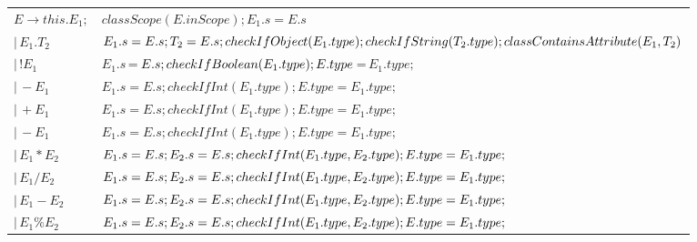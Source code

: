 \documentclass[11pt, oneside]{article}
\begin{document}
\begin{tabularx}{\textwidth}{ |X|X| }
\hline $E \rightarrow this.E_1; $ & $ classScope(E.inScope); E_1.s = E.s $ \\

	   $| \, E_1.T_2 $ & $ E_1.s = E.s; T_2 = E.s; checkIfObject(E_1.type); \newline checkIfString(T_2.type); \newline classContainsAttribute(E_1, T_2) $ \\
	   
	   $| \, !E_1 $ & $ E_1.s\,$=$\,E.s; checkIfBoolean(E_1.type); \newline E.type\,$=$\,E_1.type; $ \\
	   
	   $| \, -E_1 $ & $ E_1.s = E.s; checkIfInt(E_1.type); E.type = E_1.type; $ \\
	   $| \, +E_1 $ & $ E_1.s = E.s; checkIfInt(E_1.type); E.type = E_1.type; $ \\
	   $| \, -E_1 $ & $ E_1.s = E.s; checkIfInt(E_1.type); E.type = E_1.type; $ \\
	   
	   $| \, E_1*E_2 $ & $ E_1.s = E.s; E_2.s = E.s; \newline checkIfInt(E_1.type, E_2.type); E.type = E_1.type; $ \\	   
	   $| \, E_1/E_2 $ & $ E_1.s = E.s; E_2.s = E.s; \newline checkIfInt(E_1.type, E_2.type); E.type = E_1.type; $ \\	
	   $| \, E_1-E_2 $ & $ E_1.s = E.s; E_2.s = E.s; \newline checkIfInt(E_1.type, E_2.type); E.type = E_1.type; $ \\
	   $| \, E_1\%E_2 $ & $ E_1.s = E.s; E_2.s = E.s; \newline checkIfInt(E_1.type, E_2.type); E.type = E_1.type; $ \\ 
	   

\end{tabularx}
\end{document}
